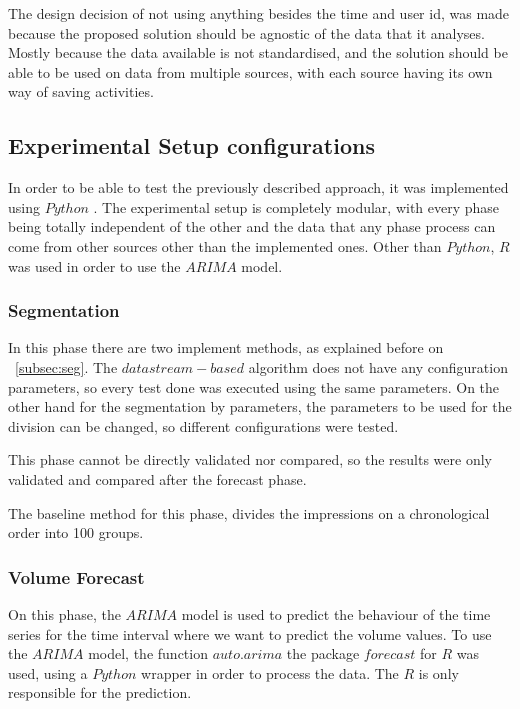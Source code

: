 The design decision of not using anything besides the time and user id, was made
because the proposed solution should be agnostic of the data that it analyses.
Mostly because the data available is not standardised, and the solution should be
able to be used on data from multiple sources, with each source having its own
way of saving activities.

\subsection{Experimental Setup configurations}

In order to be able to test the previously described approach, it was
implemented
using $Python$ . The experimental setup is completely modular, with every phase
being
totally independent of the other and the data that any phase process can come
from other sources other than the implemented ones.
Other than $Python$, $R$ was used in order to use the $ARIMA$ model.

\subsubsection*{Segmentation}

In this phase there are two implement methods, as explained
before on ~\ref{subsec:seg}. The $data stream-based$ algorithm does not have any
configuration parameters, so every test done was executed using the same parameters.
On the other hand for the segmentation by parameters, the parameters to be used for
the division can be changed, so different configurations were tested.

This phase cannot be directly validated nor compared, so the results were
only validated and compared after the forecast phase.

The baseline method for this phase, divides the impressions on a chronological
order into 100 groups.

\subsubsection*{Volume Forecast}

On this phase, the $ARIMA$ model is used to predict the behaviour of the time
series for the time interval where we want to predict the volume values. To use
the $ARIMA$ model, the function $auto.arima$ the package $forecast$ \cite{hyndman2007automatic} for $R$
was used, using a $Python$ wrapper in order to process the data. The $R$ is only
responsible for the prediction.

